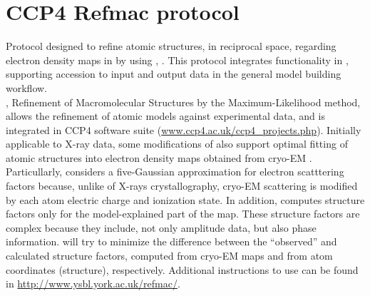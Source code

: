 \section{CCP4 Refmac protocol}
\label{app:ccp4Refmac}%

Protocol designed to refine atomic structures, in reciprocal space, regarding electron density maps in \scipion by using  \citep{vagin2004}, \citep{kovalevskiy2018}. This protocol integrates  functionality in \scipion, supporting accession to  input and output data in the general model building workflow.\\, Refinement of Macromolecular Structures by the Maximum-Likelihood method, allows the refinement of atomic models against experimental data, and is integrated in CCP4 software suite (\url{www.ccp4.ac.uk/ccp4_projects.php}). Initially applicable to X-ray data, some modifications of  also support optimal fitting of atomic structures into electron density maps obtained from cryo-EM \citep{brown2015}. Particullarly,  considers a five-Gaussian approximation for electron scatttering factors because, unlike of X-rays crystallography, cryo-EM scattering is modified by each atom electric charge and ionization state. In addition,  computes structure factors only for the model-explained part of the map. These structure factors are complex because they include, not only amplitude data, but also phase information.  will try to minimize the difference between the ``observed'' and calculated structure factors, computed from cryo-EM maps and from atom coordinates (structure), respectively. Additional instructions to use  can be found in \url{http://www.ysbl.york.ac.uk/refmac/}.  

